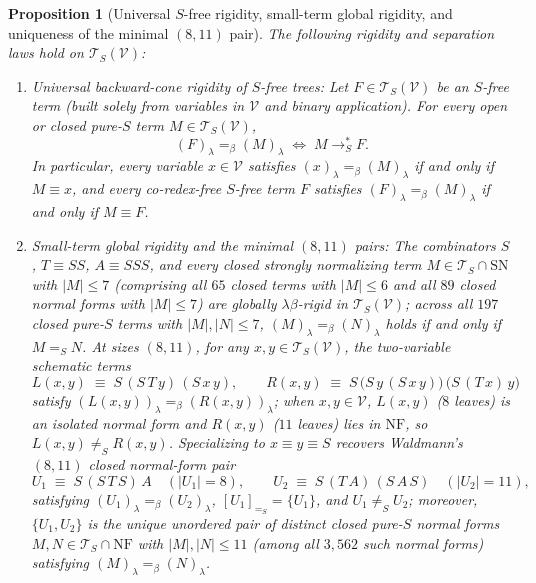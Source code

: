\documentclass[11pt,reqno]{amsart}
\numberwithin{equation}{section}
\theoremstyle{plain}
\newtheorem{proposition}[theorem]{Proposition}
\theoremstyle{definition}
\theoremstyle{remark}
\newcommand{\TS}{\mathcal{T}_S}
\newcommand{\TSV}{\mathcal{T}_S(\mathcal{V})}
\newcommand{\NF}{\mathrm{NF}}
\newcommand{\SN}{\mathrm{SN}}
\newcommand{\redSs}{\to_S^*}
\newcommand{\convS}{=_S}
\begin{document}
\begin{proposition}[Universal $S$-free rigidity, small-term global rigidity, and uniqueness of the minimal $(8, 11)$ pair]\label{prop:q32-rigidity-waldmann-pair}
The following rigidity and separation laws hold on $\TSV$:
\begin{enumerate}[label=(\roman*),leftmargin=2.2em]
  \item \emph{Universal backward-cone rigidity of $S$-free trees:} Let $F \in \TSV$ be an $S$-free term (built solely from variables in $\mathcal{V}$ and binary application). For every open or closed pure-$S$ term $M \in \TSV$,
  \begin{equation}\label{eq:sfree-rigidity}
    (F)_\lambda =_\beta (M)_\lambda \;\iff\; M \redSs F.
  \end{equation}
  In particular, every variable $x \in \mathcal{V}$ satisfies $(x)_\lambda =_\beta (M)_\lambda$ if and only if $M \equiv x$, and every co-redex-free $S$-free term $F$ satisfies $(F)_\lambda =_\beta (M)_\lambda$ if and only if $M \equiv F$.
  \item \emph{Small-term global rigidity and the minimal $(8, 11)$ pairs:} The combinators $S$, $T \equiv S S$, $A \equiv S S S$, and every closed strongly normalizing term $M \in \TS \cap \SN$ with $|M| \le 7$ (comprising all $65$ closed terms with $|M| \le 6$ and all $89$ closed normal forms with $|M| \le 7$) are globally $\lambda\beta$-rigid in $\TSV$; across all $197$ closed pure-$S$ terms with $|M|, |N| \le 7$, $(M)_\lambda =_\beta (N)_\lambda$ holds if and only if $M \convS N$. At sizes $(8, 11)$, for any $x, y \in \TSV$, the two-variable schematic terms
  \begin{equation}\label{eq:open-8-11-pair}
    L(x, y) \;\equiv\; S\,(S\,T\,y)\,(S\,x\,y), \qquad R(x, y) \;\equiv\; S\,\bigl(S\,y\,(S\,x\,y)\bigr)\,\bigl(S\,(T\,x)\,y\bigr)
  \end{equation}
  satisfy $(L(x, y))_\lambda =_\beta (R(x, y))_\lambda$; when $x, y \in \mathcal{V}$, $L(x, y)$ ($8$ leaves) is an isolated normal form and $R(x, y)$ ($11$ leaves) lies in $\NF$, so $L(x, y) \not\convS R(x, y)$. Specializing to $x \equiv y \equiv S$ recovers Waldmann's $(8, 11)$ closed normal-form pair \cite{Waldmann2000}
  \begin{equation}\label{eq:waldmann-8-11-pair}
    U_1 \;\equiv\; S\,(S\,T\,S)\,A \quad (|U_1| = 8), \qquad U_2 \;\equiv\; S\,(T\,A)\,(S\,A\,S) \quad (|U_2| = 11),
  \end{equation}
  satisfying $(U_1)_\lambda =_\beta (U_2)_\lambda$, $[U_1]_{\convS} = \{U_1\}$, and $U_1 \not\convS U_2$; moreover, $\{U_1, U_2\}$ is the unique unordered pair of distinct closed pure-$S$ normal forms $M, N \in \TS \cap \NF$ with $|M|, |N| \le 11$ (among all $3{,}562$ such normal forms) satisfying $(M)_\lambda =_\beta (N)_\lambda$.
\end{enumerate}
\end{proposition}
\end{document}
